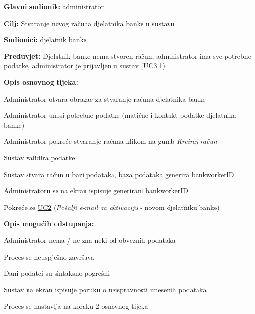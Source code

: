					\begin{packed_item}
	
						\item \textbf{Glavni sudionik: }administrator
						\item  \textbf{Cilj:} Stvaranje novog računa djelatnika banke u sustavu
						\item  \textbf{Sudionici:} djelatnik banke
						\item  \textbf{Preduvjet:} Djelatnik banke nema stvoren račun, administrator ima sve potrebne podatke, administrator je prijavljen u sustav (\hyperref[UC3.1]{UC3.1})
						\item  \textbf{Opis osnovnog tijeka:}
						
						\item[] \begin{packed_enum}
                        	\item Administrator otvara obrazac za stvaranje računa djelatnika banke
							\item Administrator unosi potrebne podatke (matične i kontakt podatke djelatnika banke)
							\item Administrator pokreće stvaranje računa klikom na gumb \textit{Kreiraj račun}
							\item Sustav validira podatke 
							\item Sustav stvara račun u bazi podataka, baza podataka generira bankworkerID
							\item Administratoru se na ekran ispisuje generirani bankworkerID
							\item Pokreće se \hyperref[UC2]{UC2} (\textit{Pošalji e-mail za aktivaciju} - novom djelatniku banke)
						\end{packed_enum}
						
						\item  \textbf{Opis mogućih odstupanja:}
						
						\item[] \begin{packed_item}
	
                        	\item[2.a] Administrator nema / ne zna neki od obveznih podataka
							\begin{packed_enum}
								\item Proces se neuspješno završava
							\end{packed_enum}
						
							\item[4.a] Dani podatci su sintaksno pogrešni
							\begin{packed_enum}
								\item Sustav na ekran ispisuje poruku o neispravnosti unesenih podataka
								\item Proces se nastavlja na koraku 2 osnovnog tijeka
							\end{packed_enum}
							

\end{packed_item}
\end{packed_item}
